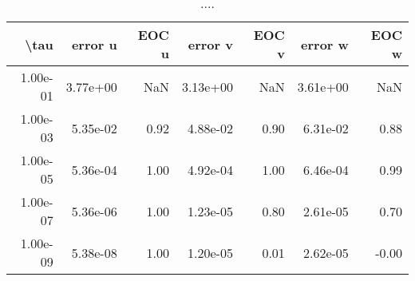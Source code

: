 \begin{table}[ht]
\centering
\begin{tabular}{rrrrrrr}
  \hline
  \textbf{\textbackslash{}tau} & \textbf{error u} & \textbf{EOC u} & \textbf{error v} & \textbf{EOC v} & \textbf{error w} & \textbf{EOC w} \\\hline
  1.00e-01 & 3.77e+00 & NaN & 3.13e+00 & NaN & 3.61e+00 & NaN \\
  1.00e-03 & 5.35e-02 & 0.92 & 4.88e-02 & 0.90 & 6.31e-02 & 0.88 \\
  1.00e-05 & 5.36e-04 & 1.00 & 4.92e-04 & 1.00 & 6.46e-04 & 0.99 \\
  1.00e-07 & 5.36e-06 & 1.00 & 1.23e-05 & 0.80 & 2.61e-05 & 0.70 \\
  1.00e-09 & 5.38e-08 & 1.00 & 1.20e-05 & 0.01 & 2.62e-05 & -0.00 \\\hline
\end{tabular}
\caption{....}
\end{table}
